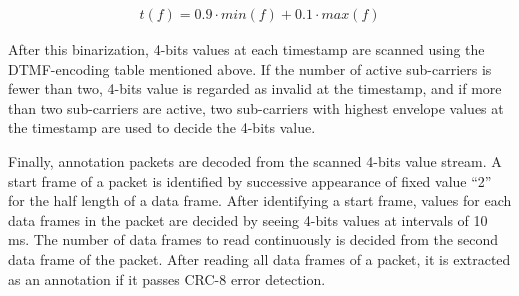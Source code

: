 \begin{align}
t(f) = 0.9 \cdot min(f) + 0.1 \cdot max(f)
\end{align}

After this binarization, 4-bits values at each timestamp are scanned using the DTMF-encoding table mentioned above.
If the number of active sub-carriers is fewer than two, 4-bits value is regarded as invalid  at the timestamp, and if more than two sub-carriers are active, two sub-carriers with highest envelope values at the timestamp are used to decide the 4-bits value.

Finally, annotation packets are decoded from the scanned 4-bits value stream.
A start frame of a packet is identified by successive appearance of fixed value ``2'' for the half length of a data frame.
After identifying a start frame, values for each data frames in the packet are decided by seeing 4-bits values at intervals of 10 ms.
The number of data frames to read continuously is decided from the second data frame of the packet.
After reading all data frames of a packet, it is extracted as an annotation if it passes CRC-8 error detection.